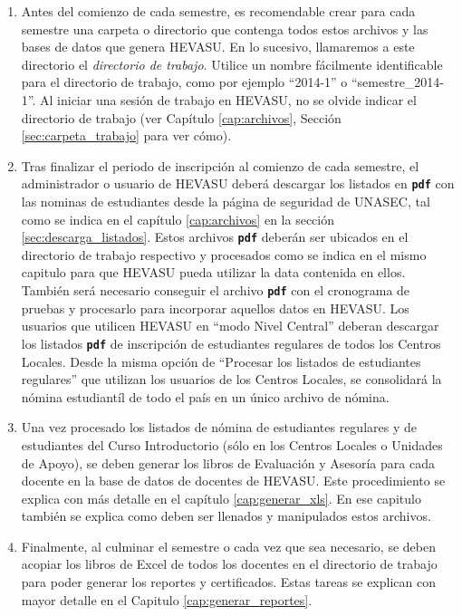 \documentclass[letterpaper,12pt]{book}
\newcommand{\fileformat}[1]{\textbf{\texttt{#1}}}
\begin{document}
\begin{enumerate}
	\item Antes del comienzo de cada semestre, es recomendable crear para cada semestre una carpeta o directorio que contenga todos estos archivos y las bases de datos que genera HEVASU. En lo sucesivo, llamaremos a este directorio el \emph{directorio de trabajo}. Utilice un nombre fácilmente identificable para el directorio de trabajo, como por ejemplo ``2014-1'' o ``semestre\_2014-1''. Al iniciar una sesión de trabajo en HEVASU, no se olvide indicar el directorio de trabajo (ver Capítulo \ref{cap:archivos}, Sección \ref{sec:carpeta_trabajo} para ver cómo).
	\item Tras finalizar el periodo de inscripción al comienzo de cada semestre, el administrador o usuario de HEVASU deberá descargar los listados en \fileformat{pdf} con las nominas de estudiantes desde la página de seguridad de UNASEC, tal como se indica en el capítulo \ref{cap:archivos} en la sección \ref{sec:descarga_listados}. Estos archivos \fileformat{pdf} deberán ser ubicados en el directorio de trabajo respectivo y procesados como se indica en el mismo capitulo para que HEVASU pueda utilizar la data contenida en ellos. También será necesario conseguir el archivo \fileformat{pdf} con el cronograma de pruebas y procesarlo para incorporar aquellos datos en HEVASU.  Los usuarios que utilicen HEVASU en ``modo Nivel Central'' deberan descargar los listados \fileformat{pdf} de inscripción de estudiantes regulares de todos los Centros Locales. Desde la misma opción de ``Procesar los listados de estudiantes regulares'' que utilizan los usuarios de los Centros Locales, se consolidará la nómina estudiantíl de todo el país en un único archivo de nómina.
	\item Una vez procesado los listados de nómina de estudiantes regulares y de estudiantes del Curso Introductorio (sólo en los Centros Locales o Unidades de Apoyo), se deben generar los libros de Evaluación y Asesoría para cada docente en la base de datos de docentes de HEVASU. Este procedimiento se explica con más detalle en el capítulo \ref{cap:generar_xls}. En ese capitulo también se explica como deben ser llenados y manipulados estos archivos.
	\item Finalmente, al culminar el semestre o cada vez que sea necesario, se deben acopiar los libros de Excel de todos los docentes en el directorio de trabajo para poder generar los reportes y certificados. Estas tareas se explican con mayor detalle en el Capitulo \ref{cap:generar_reportes}.
\end{enumerate}
\end{document}
